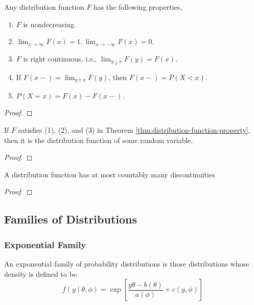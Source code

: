 \begin{theorem} \label{thm:distribution-function-property}
	Any distribution function $F$ has the following properties,
	\begin{enumerate}
		\item $F$ is nondecreasing.
		\item $\lim_{x\rightarrow\infty}F(x)=1,\lim_{x \rightarrow-\infty}F(x)=0$.
		\item $F$ is right continuous, i.e., $\lim_{y \downarrow x} F(y)=F(x)$.
		\item If $F(x-)=\lim_{y\uparrow x}F(y)$, then $F(x-)=P(X<x)$.
		\item $P(X=x)=F(x)-F(x-)$.
	\end{enumerate}
\end{theorem}

\begin{proof}

\end{proof}

\begin{theorem}
	If $F$ satisfies (1), (2), and (3) in Theorem \ref{thm:distribution-function-property}, then it is the distribution function of some random variable.
\end{theorem}

\begin{proof}

\end{proof}

\begin{theorem}
	A distribution function has at most countably many discontinuities
\end{theorem}

\begin{proof}

\end{proof}

\subsection{Families of Distributions}

\subsubsection{Exponential Family}

\begin{definition} \label{def:exponential-family}
	An exponential family of probability distributions is those distributions whose density is defined to be
	\begin{equation}
		f\left(y\mid\theta,\phi\right)=\exp\left[\frac{y\theta-b(\theta)}{a(\phi)}+c(y,\phi)\right]
	\end{equation}
\end{definition}

